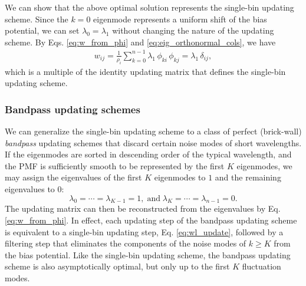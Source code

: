 \documentclass[preprint, superscriptaddress, floatfix]{revtex4-1}
\newcommand{\Err}{E}
\begin{document}
We can show that the above optimal solution
represents the single-bin updating scheme.
%
Since the $k = 0$ eigenmode represents
a uniform shift of the bias potential,
we can set $\lambda_0 = \lambda_1$
without changing the nature of the updating scheme.
%
By Eqs. \eqref{eq:w_from_phi} and
\eqref{eq:eig_orthonormal_cols}, we have
\begin{align*}
  w_{ij}
  = \frac{1}{\rho_i} \sum_{k=0}^{n-1} \lambda_1 \, \phi_{ki} \, \phi_{kj}
  = \lambda_1 \, \delta_{ij}
  ,
\end{align*}
which is a multiple of the identity updating matrix
that defines the single-bin updating scheme.
%
%
%
%
%




\subsubsection{\label{sec:bandpass}
Bandpass updating schemes}


We can generalize
the single-bin updating scheme to a class of
perfect (brick-wall) \emph{bandpass} updating schemes
that discard certain noise modes
of short wavelengths.
%
If the eigenmodes are sorted in descending order
of the typical wavelength,
and the PMF is sufficiently smooth
to be represented by the first $K$
eigenmodes,
we may assign the eigenvalues of the first $K$ eigenmodes to $1$
and the remaining eigenvalues to $0$:
%
\begin{equation}
  \lambda_0 = \cdots = \lambda_{K-1} = 1
  ,
  \mathrm{\; and \;}
  \lambda_K = \cdots = \lambda_{n-1} = 0
  .
  \label{eq:lambda_bandpass}
\end{equation}
%
The updating matrix can then be reconstructed
from the eigenvalues by Eq. \eqref{eq:w_from_phi}.
%
%
In effect, each updating step of the bandpass updating scheme
is equivalent to a single-bin updating step,
Eq. \eqref{eq:wl_update},
followed by a filtering step
that eliminates the components of the noise modes of $k \ge K$
from the bias potential.
%
%
Like the single-bin updating scheme,
the bandpass updating scheme is also
asymptotically optimal,
but only up to the first $K$ fluctuation modes.
\end{document}
